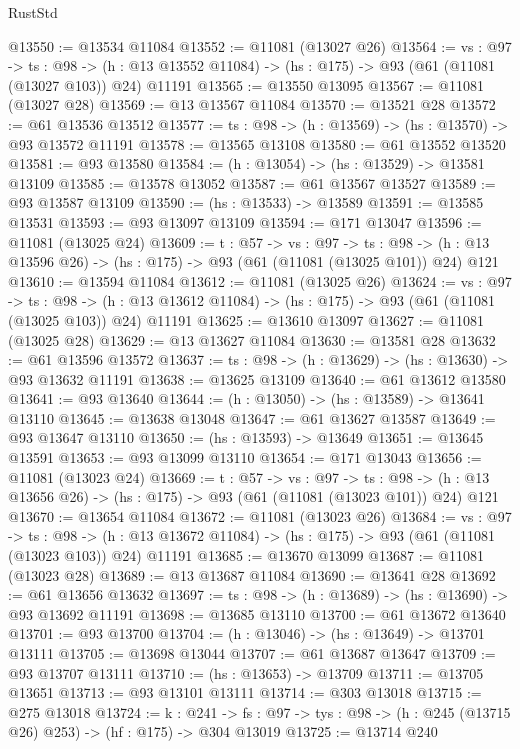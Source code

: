 \begin{lexlean}{RustStd}
\begin{coremodule}
@13550 := @13534 @11084
@13552 := @11081 (@13027 @26)
@13564 := {vs : @97} ->
  {ts : @98} ->
  (h : @13 @13552 @11084) -> (hs : @175) -> @93 (@61 (@11081 (@13027 @103)) @24) @11191
@13565 := @13550 @13095
@13567 := @11081 (@13027 @28)
@13569 := @13 @13567 @11084
@13570 := @13521 @28
@13572 := @61 @13536 @13512
@13577 := {ts : @98} -> (h : @13569) -> (hs : @13570) -> @93 @13572 @11191
@13578 := @13565 @13108
@13580 := @61 @13552 @13520
@13581 := @93 @13580
@13584 := (h : @13054) -> (hs : @13529) -> @13581 @13109
@13585 := @13578 @13052
@13587 := @61 @13567 @13527
@13589 := @93 @13587 @13109
@13590 := (hs : @13533) -> @13589
@13591 := @13585 @13531
@13593 := @93 @13097 @13109
@13594 := @171 @13047
@13596 := @11081 (@13025 @24)
@13609 := {t : @57} ->
  {vs : @97} ->
  {ts : @98} -> (h : @13 @13596 @26) -> (hs : @175) -> @93 (@61 (@11081 (@13025 @101)) @24) @121
@13610 := @13594 @11084
@13612 := @11081 (@13025 @26)
@13624 := {vs : @97} ->
  {ts : @98} ->
  (h : @13 @13612 @11084) -> (hs : @175) -> @93 (@61 (@11081 (@13025 @103)) @24) @11191
@13625 := @13610 @13097
@13627 := @11081 (@13025 @28)
@13629 := @13 @13627 @11084
@13630 := @13581 @28
@13632 := @61 @13596 @13572
@13637 := {ts : @98} -> (h : @13629) -> (hs : @13630) -> @93 @13632 @11191
@13638 := @13625 @13109
@13640 := @61 @13612 @13580
@13641 := @93 @13640
@13644 := (h : @13050) -> (hs : @13589) -> @13641 @13110
@13645 := @13638 @13048
@13647 := @61 @13627 @13587
@13649 := @93 @13647 @13110
@13650 := (hs : @13593) -> @13649
@13651 := @13645 @13591
@13653 := @93 @13099 @13110
@13654 := @171 @13043
@13656 := @11081 (@13023 @24)
@13669 := {t : @57} ->
  {vs : @97} ->
  {ts : @98} -> (h : @13 @13656 @26) -> (hs : @175) -> @93 (@61 (@11081 (@13023 @101)) @24) @121
@13670 := @13654 @11084
@13672 := @11081 (@13023 @26)
@13684 := {vs : @97} ->
  {ts : @98} ->
  (h : @13 @13672 @11084) -> (hs : @175) -> @93 (@61 (@11081 (@13023 @103)) @24) @11191
@13685 := @13670 @13099
@13687 := @11081 (@13023 @28)
@13689 := @13 @13687 @11084
@13690 := @13641 @28
@13692 := @61 @13656 @13632
@13697 := {ts : @98} -> (h : @13689) -> (hs : @13690) -> @93 @13692 @11191
@13698 := @13685 @13110
@13700 := @61 @13672 @13640
@13701 := @93 @13700
@13704 := (h : @13046) -> (hs : @13649) -> @13701 @13111
@13705 := @13698 @13044
@13707 := @61 @13687 @13647
@13709 := @93 @13707 @13111
@13710 := (hs : @13653) -> @13709
@13711 := @13705 @13651
@13713 := @93 @13101 @13111
@13714 := @303 @13018
@13715 := @275 @13018
@13724 := {k : @241} ->
  {fs : @97} -> {tys : @98} -> (h : @245 (@13715 @26) @253) -> (hf : @175) -> @304 @13019
@13725 := @13714 @240

\end{coremodule}
\end{lexlean}
